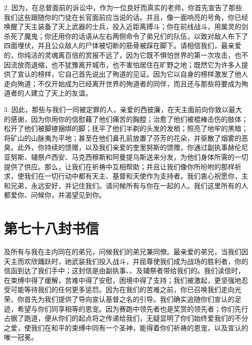 2. 因为，在总督面前的诉讼中，作为一位良好而真实的老师，你首先宣告了那些我们这些跟随你的门徒在长官面前应当说的话。并且，像一面响亮的号角，你已经唤醒了天主装备了天上武器的士兵，投入近距离搏斗；你在前线战斗，用属灵的剑杀死了魔鬼；你还用你的话语从左右两侧命令了弟兄们的队伍，以致对敌人布下了四面埋伏，并且公众敌人的尸体被切断的筋骨被踩在脚下。请相信我们，最亲爱的，你纯洁的灵魂离百倍的赏报不远了，因为它既不惧怕世界的第一次攻击，也不因流放而退缩，也不犹豫离开城市，也不害怕居住在旷野之地；既然它为许多人提供了宣认的榜样，它自己首先说出了殉道的见证。因为它以自身的榜样激发了他人走向殉道；不仅开始成为已经离开世界的殉道者的同伴，而且还与那些将要成为殉道者的人建立了天上的友谊。\par

3. 因此，那些与我们一同被定罪的人，亲爱的西彼廉，在天主面前向你致以最大的感谢，因为你用你的信慰藉了他们痛苦的胸膛；治愈了他们被棍棒击伤的肢体；松开了他们被脚镣捆绑的脚；抚平了他们半剃的头发的发梢；照亮了地牢的黑暗；将矿山的山脉夷为平地；甚至在他们鼻孔前放置了芬芳的花朵，并驱散了烟雾的恶臭。此外，你持续的馈赠，以及我们亲爱的奎里努斯的馈赠，你通过副执事赫伦尼亚努斯、辅祭卢西安、马克西穆斯和阿曼提乌斯送来分发，为他们身体所需的一切提供了供应。那么，让我们在祈祷中互相帮助；并且让我们像你所吩咐的那样祈求，使我们在一切行动中都有天主、基督和天使作为支持者。我们衷心祝愿你，主和兄弟，永远安好，并记住我们。请问候所有与你在一起的人。我们这里所有的人都爱你、问候你，并渴望见到你。\par



\section{第七十八封书信}

\par

\par

及所有与我在主内同在的弟兄，问候我们的弟兄兼同僚。最亲爱的弟兄，当我们因天主而欢欣踊跃时，祂武装我们投入战斗，并屈尊使我们成为战场的胜利者，你的信函到达了我们手中；这封信是由副执事、、及辅祭者带给我们的。我们读信时，在束缚中得了缓解，苦难中得了安慰，困境中得了支持；我们被激起，更坚强地忍受可能等待我们的任何更多惩罚。因为在我们的苦难之前，你已召唤我们走向光荣，你首先为我们提供了导向宣认基督之名的引导。我们确实追随你们宣认的足迹，希望与你们同享相等的恩宠。因为赛跑中领先者也是奖赏的领先者；你们先行占据了跑道，便从你们的起点将之传递给我们，无疑显明了你们始终爱我们的不分之爱，使我们在和平的束缚中同有一个圣神，能得着你们祈祷的恩宠，以及宣认的唯一冠冕。\par


